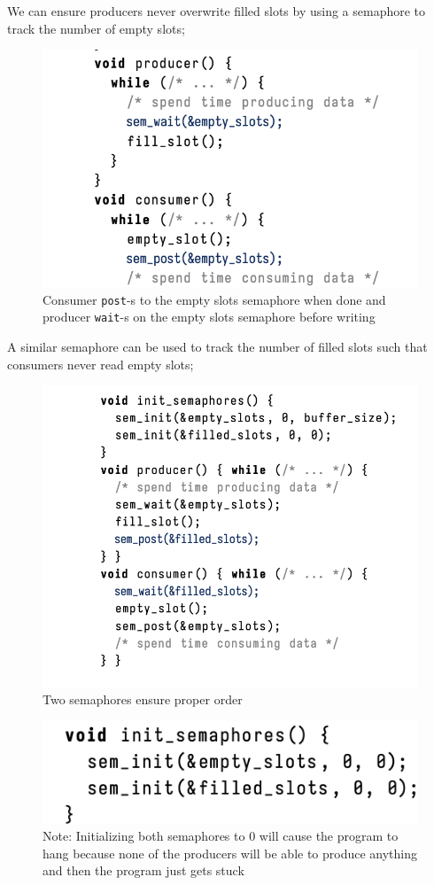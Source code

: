 \documentclass[../notes.tex]{subfiles}
\begin{document}
We can ensure producers never overwrite filled slots by using a semaphore to track the number of empty slots;

\begin{figure}[H]
    \centering
    \includegraphics[width=0.8\linewidth]{img/image_2023-03-08-14-14-32.png}
    \caption{Consumer \texttt{post}-s to the empty slots semaphore when done and producer \texttt{wait}-s on the empty slots semaphore before writing}
\end{figure}

A similar semaphore can be used to track the number of filled slots such that consumers never read empty slots;

\begin{figure}[H]
    \centering
    \includegraphics[width=0.8\linewidth]{img/image_2023-03-08-14-15-49.png}
    \caption{Two semaphores ensure proper order}
\end{figure}


\begin{figure}[H]
    \centering
    \includegraphics[width=0.8\linewidth]{img/image_2023-03-08-14-32-50.png}
    \caption{Note: Initializing both semaphores to 0 will cause the program to hang because none of the producers will be able to produce anything and then the program just gets stuck}
\end{figure}
\end{document}

